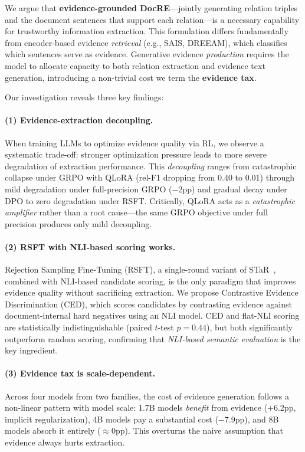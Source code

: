 \documentclass[11pt,a4paper]{article}
\begin{document}
We argue that \textbf{evidence-grounded DocRE}---jointly generating relation triples and the document sentences that support each relation---is a necessary capability for trustworthy information extraction.
This formulation differs fundamentally from encoder-based evidence \emph{retrieval} (e.g., SAIS, DREEAM), which classifies which sentences serve as evidence.
Generative evidence \emph{production} requires the model to allocate capacity to both relation extraction and evidence text generation, introducing a non-trivial cost we term the \textbf{evidence tax}.

Our investigation reveals three key findings:

\paragraph{(1) Evidence-extraction decoupling.}
When training LLMs to optimize evidence quality via RL, we observe a systematic trade-off: stronger optimization pressure leads to more severe degradation of extraction performance.
This \emph{decoupling} ranges from catastrophic collapse under GRPO with QLoRA (rel-F1 dropping from 0.40 to 0.01) through mild degradation under full-precision GRPO ($-$2pp) and gradual decay under DPO to zero degradation under RSFT.
Critically, QLoRA acts as a \emph{catastrophic amplifier} rather than a root cause---the same GRPO objective under full precision produces only mild decoupling.

\paragraph{(2) RSFT with NLI-based scoring works.}
Rejection Sampling Fine-Tuning (RSFT), a single-round variant of STaR~\cite{zelikman2022star}, combined with NLI-based candidate scoring, is the only paradigm that improves evidence quality without sacrificing extraction.
We propose Contrastive Evidence Discrimination (CED), which scores candidates by contrasting evidence against document-internal hard negatives using an NLI model.
CED and flat-NLI scoring are statistically indistinguishable (paired $t$-test $p=0.44$), but both significantly outperform random scoring, confirming that \emph{NLI-based semantic evaluation} is the key ingredient.

\paragraph{(3) Evidence tax is scale-dependent.}
Across four models from two families, the cost of evidence generation follows a non-linear pattern with model scale: 1.7B models \emph{benefit} from evidence (+6.2pp, implicit regularization), 4B models pay a substantial cost ($-$7.9pp), and 8B models absorb it entirely ($\approx$0pp).
This overturns the naive assumption that evidence always hurts extraction.
\end{document}
